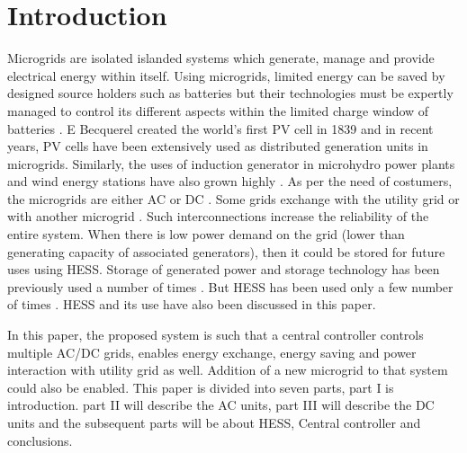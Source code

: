\documentclass[journal,twoside]{IEEEtran}
\begin{document}
\section{Introduction}
Microgrids are isolated islanded systems which generate, manage and provide electrical energy within itself. Using microgrids, limited energy can be saved by designed source holders such as batteries but their technologies must be expertly managed to control its different aspects within the limited charge window of batteries \cite{Arnold2050}. E Becquerel created the world's first PV cell in 1839 \cite{Zamostny2013}  and in recent years, PV cells have been extensively used as distributed generation units in microgrids. Similarly, the uses of induction generator in microhydro power plants and wind energy stations have also grown highly \cite{Liu2015}. As per the need of costumers, the microgrids are either AC \cite{Liu2015}  or DC \cite{Chen2015,Piagi2006,Lee2015,Madduri2015} . 
Some grids exchange with the utility grid \cite{Chen2015}  or with another microgrid \cite{Lee2015}. Such interconnections increase the reliability of the entire system. When there is low power demand on the grid (lower than generating capacity of associated generators), then it could be stored for future uses using HESS. Storage of generated power and storage technology has been previously used a number of times \cite{Lee2015, Madduri2015, Vosoloo2050, Zenned2015, Latreche2015, Yahyaoui2015, Khaldi2015} . But HESS has been used only a few number of times \cite{Piagi2006, Lee2015, Khaldi2015} . HESS and its use have also been discussed in this paper. 

\bigskip
In this paper, the proposed system is such that a central controller controls multiple AC/DC grids, enables energy exchange, energy saving and power interaction with utility grid as well. Addition of a new microgrid to that system could also be enabled. This paper is divided into seven parts, part I is introduction. part II will describe the AC units, part III will describe the DC units and the subsequent parts will be about HESS, Central controller and conclusions.
\end{document}
